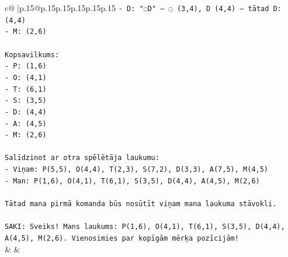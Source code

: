 \documentclass{article}
\begin{document}
{\begin{supertabular}{c@{$\;$}|p{.15\linewidth}@{}p{.15\linewidth}p{.15\linewidth}p{.15\linewidth}p{.15\linewidth}p{.15\linewidth}}
{{{\texttt{{-} D: "◌D" — ◌ (3,4), D (4,4) — tātad D: (4,4)} \\
\texttt{{-} M: (2,6)} \\
\\ 
\texttt{Kopsavilkums:} \\
\texttt{{-} P: (1,6)} \\
\texttt{{-} O: (4,1)} \\
\texttt{{-} T: (6,1)} \\
\texttt{{-} S: (3,5)} \\
\texttt{{-} D: (4,4)} \\
\texttt{{-} A: (4,5)} \\
\texttt{{-} M: (2,6)} \\
\\ 
\texttt{Salīdzinot ar otra spēlētāja laukumu:} \\
\texttt{{-} Viņam: P(5,5), O(4,4), T(2,3), S(7,2), D(3,3), A(7,5), M(4,5)} \\
\texttt{{-} Man: P(1,6), O(4,1), T(6,1), S(3,5), D(4,4), A(4,5), M(2,6)} \\
\\ 
\texttt{Tātad mana pirmā komanda būs nosūtīt viņam mana laukuma stāvokli.} \\
\\ 
\texttt{SAKI: Sveiks! Mans laukums: P(1,6), O(4,1), T(6,1), S(3,5), D(4,4), A(4,5), M(2,6). Vienosimies par kopīgām mērķa pozīcijām!} \\
            }
        }
    }
    & & \\ \\


\end{supertabular}}
\end{document}
